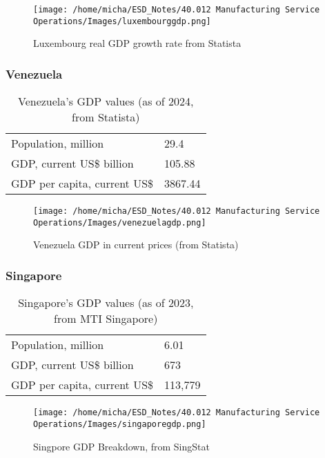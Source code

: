 \documentclass[12pt]{article}
\begin{document}
\begin{figure}[H]
    \centering
    \texttt{[image: /home/micha/ESD\_Notes/40.012 Manufacturing Service Operations/Images/luxembourggdp.png]}
    \caption{Luxembourg real GDP growth rate from Statista}
    \label{fig:5-luxgdp}
\end{figure} 


\subsubsection*{Venezuela}

\begin{table}[H]
    \centering
    \begin{tabular}{l l} \hline
        Population, million & 29.4 \\ 
        GDP, current US\$ billion & 105.88 \\ 
        GDP per capita, current US\$ & 3867.44 \\ \hline 
    \end{tabular}
    \caption{Venezuela's GDP values (as of 2024, from Statista)}
    \label{5-vengdp}
\end{table}

\begin{figure}[H]
    \centering
    \texttt{[image: /home/micha/ESD\_Notes/40.012 Manufacturing Service Operations/Images/venezuelagdp.png]}
    \caption{Venezuela GDP in current prices (from Statista)}
    \label{fig:5-vengdp}
\end{figure} 

\subsubsection*{Singapore}

\begin{table}[H]
    \centering
    \begin{tabular}{l l} \hline
        Population, million & 6.01 \\ 
        GDP, current US\$ billion & 673 \\ 
        GDP per capita, current US\$ & 113,779 \\ \hline 
    \end{tabular}
    \caption{Singapore's GDP values (as of 2023, from MTI Singapore)}
    \label{5-sggdp}
\end{table}

\begin{figure}[H]
    \centering
    \texttt{[image: /home/micha/ESD\_Notes/40.012 Manufacturing Service Operations/Images/singaporegdp.png]}
    \caption{Singpore GDP Breakdown, from SingStat}
    \label{fig:5-sggdp}
\end{figure} 
\end{document}
